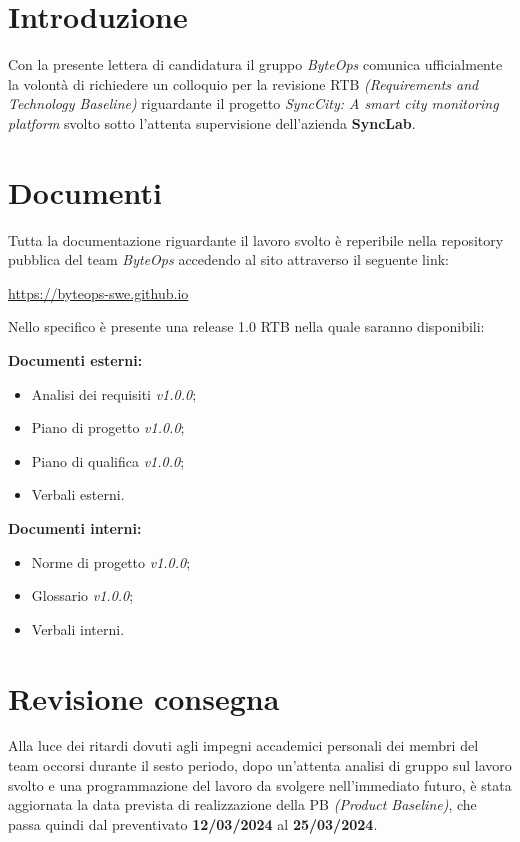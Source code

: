 \documentclass{article}
\begin{document}
\flushleft

\section{Introduzione}
Con la presente lettera di candidatura il gruppo \textit{ByteOps} comunica ufficialmente la volontà di richiedere un colloquio per la revisione RTB \textit{(Requirements and Technology Baseline)} riguardante il progetto \textit{SyncCity: A smart city monitoring platform} svolto sotto l'attenta supervisione dell'azienda \textbf{SyncLab}.

\section{Documenti}
Tutta la documentazione riguardante il lavoro svolto è reperibile nella repository pubblica del team \textit{ByteOps} accedendo al sito attraverso il seguente link:

\begin{center}
    \href{https://byteops-swe.github.io}{https://byteops-swe.github.io}
\end{center}

Nello specifico è presente una release 1.0 RTB nella quale saranno disponibili:
\vspace{0.2cm}

\textbf{Documenti esterni:}
\begin{itemize}
    \item Analisi dei requisiti \textit{v1.0.0};
    \item Piano di progetto \textit{v1.0.0};
    \item Piano di qualifica \textit{v1.0.0};
    \item Verbali esterni.
\end{itemize}
\vspace{0.2cm}

\textbf{Documenti interni:}
\begin{itemize}
    \item Norme di progetto \textit{v1.0.0};
    \item Glossario \textit{v1.0.0};
    \item Verbali interni.
\end{itemize}

\section{Revisione consegna}
Alla luce dei ritardi dovuti agli impegni accademici personali dei membri del team occorsi durante il sesto periodo, dopo un'attenta analisi di gruppo sul lavoro svolto e una programmazione del lavoro da svolgere nell'immediato futuro, è stata aggiornata la data prevista di realizzazione della PB \textit{(Product Baseline)}, che passa quindi dal preventivato \textbf{12/03/2024} al \textbf{25/03/2024}.
\end{document}
